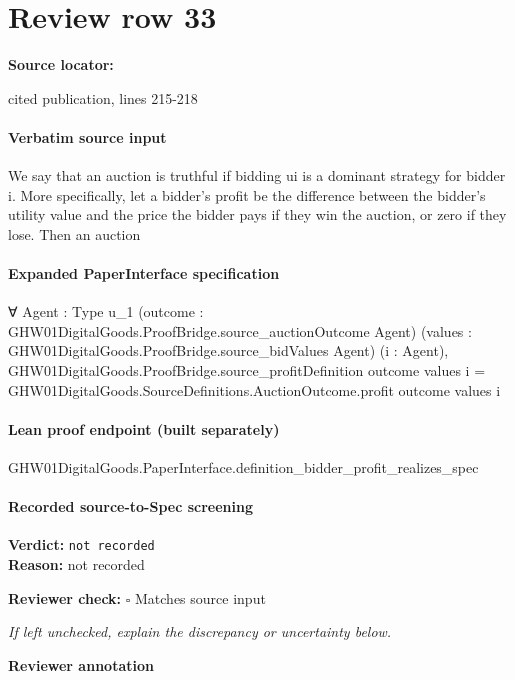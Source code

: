 \documentclass[10pt]{article}
\newcommand{\reviewerbox}{%
  \par\noindent\fbox{\parbox{0.96\linewidth}{\rule{0pt}{0.38in}}}\par
}
\newcommand{\reviewmatch}[1]{%
  \par\noindent\textbf{Reviewer check:} $\square$\; #1\par
  \noindent\emph{If left unchecked, explain the discrepancy or uncertainty below.}\par
}
\begin{document}
\section*{Review row 33}
\textbf{Source locator:} {\footnotesize\raggedright cited publication, lines 215-\allowbreak{}218\par}
\paragraph{Verbatim source input}
\begin{ReviewVerbatim}
We say that an auction is truthful if bidding ui is
a dominant strategy for bidder i. More specifically,
let a bidder’s profit be the difference between the bidder’s utility value and the price the bidder pays if they
win the auction, or zero if they lose. Then an auction
\end{ReviewVerbatim}


\paragraph{Expanded PaperInterface specification}
\begin{ReviewVerbatim}
∀ {Agent : Type u_1} (outcome : GHW01DigitalGoods.ProofBridge.source_auctionOutcome Agent)
  (values : GHW01DigitalGoods.ProofBridge.source_bidValues Agent) (i : Agent),
  GHW01DigitalGoods.ProofBridge.source_profitDefinition outcome values i =
    GHW01DigitalGoods.SourceDefinitions.AuctionOutcome.profit outcome values i
\end{ReviewVerbatim}

\paragraph{Lean proof endpoint (built separately)}\begin{ReviewVerbatim}
GHW01DigitalGoods.PaperInterface.definition_bidder_profit_realizes_spec
\end{ReviewVerbatim}

\paragraph{Recorded source-to-Spec screening}
\textbf{Verdict:} \texttt{not recorded}
\\
\textbf{Reason:} not recorded
\reviewmatch{Matches source input}
\noindent\textbf{Reviewer annotation}\par
\reviewerbox
\clearpage
\hypertarget{source-claim-3077d698b4080f2c}{}
\end{document}

